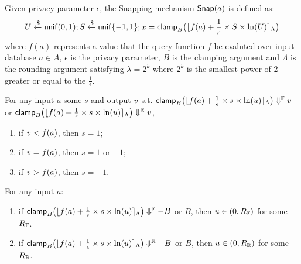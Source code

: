 \documentclass[a4paper,11pt]{article}
\begin{document}
\begin{defn}
Given privacy parameter $\epsilon$, the Snapping mechanism $\mathsf{Snap}(a)$ is defined as:
\[
	U \xleftarrow{\$} \mathsf{unif}(0,1); S \xleftarrow{\$} \mathsf{unif}\{-1, 1\};
	x = \mathsf{clamp}_B \big(
	\lfloor f(a) + \frac{1}{\epsilon} \times S \times \ln (U) \rceil_{\Lambda}
	\big)
\]
where $f(a)$ represents a value that the query function $f$ be evaluted over input database $a \in A$, $\epsilon$ is the privacy parameter, $B$ is the clamping argument and $\Lambda$ is the rounding argument satisfying $\lambda = 2^k$ where $2^k$ is the smallest power of 2 greater or equal to the $\frac{1}{\epsilon}$.
%
\end{defn}
%
%
%
\begin{lem}[sign]
\label{lem:sign}
For any input $a$ some $s$ and output $v$ s.t.
$\mathsf{clamp}_B \big(
	\lfloor f(a) + \frac{1}{\epsilon} \times s \times \ln (u) \rceil_{\Lambda}
	\big)
	\Downarrow^{\mathbb{F}} v$ 
or $\mathsf{clamp}_B \big(
	\lfloor f(a) + \frac{1}{\epsilon} \times s \times \ln (u) \rceil_{\Lambda}
	\big)
	\Downarrow^{\mathbb{R}} v$,
%
\begin{enumerate}  
	\item if $v < f(a)$, then $s = 1$;
	\item if $v = f(a)$, then $s = 1$ or $ -1$;
	\item if $v > f(a)$, then $s = -1$.
\end{enumerate}
\end{lem}
%
%
%
\begin{lem}
[clampL]
\label{lem:clampl}
For any input $a$:
\begin{enumerate}
\item 
if 
$\mathsf{clamp}_B \big(
	\lfloor f(a) + \frac{1}{\epsilon} \times s \times \ln (u) \rceil_{\Lambda}
	\big)
	\Downarrow^{\mathbb{F}} -B$ or $B$, then $u \in (0, R_{\mathbb{F}})$ for some $R_{\mathbb{F}}$.
\item
if
$\mathsf{clamp}_B \big(
	\lfloor f(a) + \frac{1}{\epsilon} \times s \times \ln (u) \rceil_{\Lambda}
	\big)
	\Downarrow^{\mathbb{R}} -B$ or $B$, then $u \in (0, R_{\mathbb{R}})$ for some $R_{\mathbb{R}}$.
\end{enumerate}
\end{lem}
\end{document}
